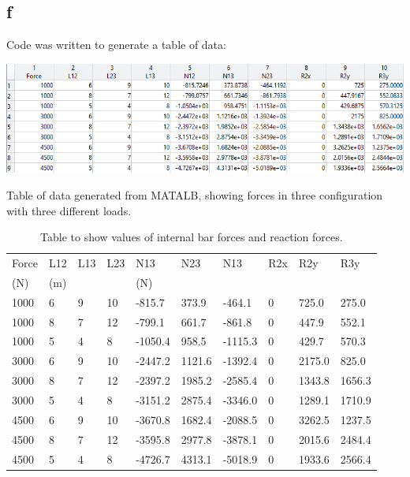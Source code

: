 \documentclass[11pt]{article}
\numberwithin{equation}{section}
\begin{document}
\subsection{f}
Code was written to generate a table of data:

\begin{table}[H]
    \centering
    \includegraphics[width = \textwidth]{./img/q2f.png}
    \caption{Table of data generated from MATALB, showing forces in three configuration with three different loads.}
\end{table}
\begin{table}[H]
    \centering
    \begin{tabular}{llllllllll}
        \toprule
        Force & L12 & L13 & L23 & N13 & N23 & N13 & R2x & R2y & R3y\\
        (\si{\newton}) & (\si{\metre}) & & & (\si{\newton}) & & & & \\
        \midrule
        1000 & 6 & 9 & 10 & -815.7  & 373.9  & -464.1  & 0 & 725.0  & 275.0  \\
        1000 & 8 & 7 & 12 & -799.1  & 661.7  & -861.8  & 0 & 447.9  & 552.1  \\
        1000 & 5 & 4 & 8  & -1050.4 & 958.5  & -1115.3 & 0 & 429.7  & 570.3  \\
        3000 & 6 & 9 & 10 & -2447.2 & 1121.6 & -1392.4 & 0 & 2175.0 & 825.0  \\
        3000 & 8 & 7 & 12 & -2397.2 & 1985.2 & -2585.4 & 0 & 1343.8 & 1656.3 \\
        3000 & 5 & 4 & 8  & -3151.2 & 2875.4 & -3346.0 & 0 & 1289.1 & 1710.9 \\
        4500 & 6 & 9 & 10 & -3670.8 & 1682.4 & -2088.5 & 0 & 3262.5 & 1237.5 \\
        4500 & 8 & 7 & 12 & -3595.8 & 2977.8 & -3878.1 & 0 & 2015.6 & 2484.4 \\
        4500 & 5 & 4 & 8  & -4726.7 & 4313.1 & -5018.9 & 0 & 1933.6 & 2566.4 \\
        \bottomrule
    \end{tabular}
    \caption{Table to show values of internal bar forces and reaction forces.}
\end{table}
\end{document}
